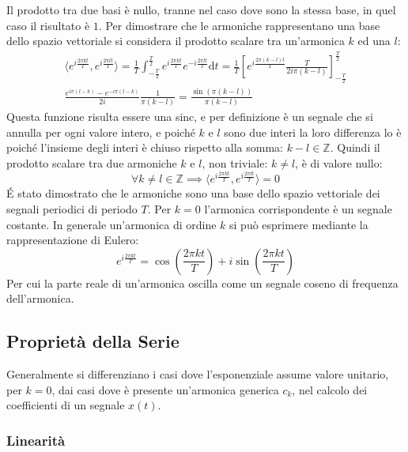 \documentclass{article}
\newcommand{\df}{\mathrm{d}}
\numberwithin{equation}{subsection}
\begin{document}
Il prodotto tra due basi è nullo, tranne nel caso dove sono la stessa base, in quel caso il risultato è $1$. Per dimostrare che le armoniche rappresentano una base dello 
spazio vettoriale si considera il prodotto scalare tra un'armonica $k$ ed una $l$:
\begin{gather*}
    \langle e^{i\frac{2\pi kt}{T}},e^{i\frac{2\pi lt}{T}}\rangle=\displaystyle\frac{1}{T}\int_{-\frac{T}{2}}^{\frac{T}{2}}e^{i\frac{2\pi kt}{T}}e^{-i\frac{2\pi lt}{T}}\df t=
    \frac{1}{T}\left[e^{i\frac{2\pi(k-l)t}{T}}\frac{T}{2i\pi (k-l)}\right]^{\frac{T}{2}}_{-\frac{T}{2}}\\
    \displaystyle\frac{e^{i\pi(l-k)}-e^{-i\pi(l-k)}}{2i}\frac{1}{\pi (k-l)}=\frac{\sin(\pi(k-l))}{\pi (k-l)}
\end{gather*} 
Questa funzione risulta essere una sinc, e per definizione è un segnale che si annulla per ogni valore intero, e poiché $k$ e $l$ sono due interi la loro differenza lo è 
poiché l'insieme degli interi è chiuso rispetto alla somma: $k-l\in\mathbb{Z}$. Quindi il prodotto scalare tra due armoniche $k$ e $l$, non triviale: $k\neq l$, è di valore 
nullo:
\begin{equation*}
    \forall k\neq l\in\mathbb{Z}\implies \langle e^{i\frac{2\pi kt}{T}},e^{i\frac{2\pi lt}{T}}\rangle=0
\end{equation*}
\'{E} stato dimostrato che le armoniche sono una base dello spazio vettoriale dei segnali periodici di periodo $T$. 
Per $k=0$ l'armonica corrispondente è un segnale costante. In generale un'armonica di ordine $k$ si può esprimere mediante la rappresentazione di Eulero:
\begin{equation*}
    \displaystyle e^{i\frac{2\pi kt}{T}}=\cos\left(\frac{2\pi kt}{T}\right)+i\sin\left(\frac{2\pi kt}{T}\right)
\end{equation*}
Per cui la parte reale di un'armonica oscilla come un segnale coseno di frequenza dell'armonica. 

\subsection{Proprietà della Serie}

Generalmente si differenziano i casi dove l'esponenziale assume valore unitario, per $k=0$, dai casi dove è presente un'armonica generica $c_k$, nel calcolo 
dei coefficienti di un segnale $x(t)$. 
\subsubsection{Linearità}
\end{document}
